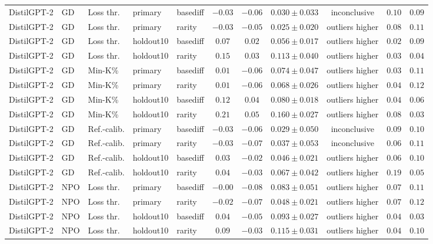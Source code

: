 \begin{table}[t]
\begin{tabular*}{\textwidth}{@{\extracolsep{\fill}}lllllcccccc@{}}
DistilGPT-2 & GD & Loss thr. & primary & basediff & $-0.03$ & $-0.06$ & $0.030 \pm 0.033$ & inconclusive & $0.10$ & $0.09$ \\
DistilGPT-2 & GD & Loss thr. & primary & rarity & $-0.03$ & $-0.05$ & $0.025 \pm 0.020$ & outliers higher & $0.08$ & $0.11$ \\
DistilGPT-2 & GD & Loss thr. & holdout10 & basediff & $0.07$ & $0.02$ & $0.056 \pm 0.017$ & outliers higher & $0.02$ & $0.09$ \\
DistilGPT-2 & GD & Loss thr. & holdout10 & rarity & $0.15$ & $0.03$ & $0.113 \pm 0.040$ & outliers higher & $0.03$ & $0.04$ \\
DistilGPT-2 & GD & Min-K\% & primary & basediff & $0.01$ & $-0.06$ & $0.074 \pm 0.047$ & outliers higher & $0.03$ & $0.11$ \\
DistilGPT-2 & GD & Min-K\% & primary & rarity & $0.01$ & $-0.06$ & $0.068 \pm 0.026$ & outliers higher & $0.04$ & $0.12$ \\
DistilGPT-2 & GD & Min-K\% & holdout10 & basediff & $0.12$ & $0.04$ & $0.080 \pm 0.018$ & outliers higher & $0.04$ & $0.06$ \\
DistilGPT-2 & GD & Min-K\% & holdout10 & rarity & $0.21$ & $0.05$ & $0.160 \pm 0.027$ & outliers higher & $0.08$ & $0.03$ \\
DistilGPT-2 & GD & Ref.-calib. & primary & basediff & $-0.03$ & $-0.06$ & $0.029 \pm 0.050$ & inconclusive & $0.09$ & $0.10$ \\
DistilGPT-2 & GD & Ref.-calib. & primary & rarity & $-0.03$ & $-0.07$ & $0.037 \pm 0.053$ & inconclusive & $0.06$ & $0.11$ \\
DistilGPT-2 & GD & Ref.-calib. & holdout10 & basediff & $0.03$ & $-0.02$ & $0.046 \pm 0.021$ & outliers higher & $0.06$ & $0.10$ \\
DistilGPT-2 & GD & Ref.-calib. & holdout10 & rarity & $0.04$ & $-0.03$ & $0.067 \pm 0.042$ & outliers higher & $0.19$ & $0.05$ \\
DistilGPT-2 & NPO & Loss thr. & primary & basediff & $-0.00$ & $-0.08$ & $0.083 \pm 0.051$ & outliers higher & $0.07$ & $0.11$ \\
DistilGPT-2 & NPO & Loss thr. & primary & rarity & $-0.02$ & $-0.07$ & $0.048 \pm 0.021$ & outliers higher & $0.07$ & $0.12$ \\
DistilGPT-2 & NPO & Loss thr. & holdout10 & basediff & $0.04$ & $-0.05$ & $0.093 \pm 0.027$ & outliers higher & $0.04$ & $0.03$ \\
DistilGPT-2 & NPO & Loss thr. & holdout10 & rarity & $0.09$ & $-0.03$ & $0.115 \pm 0.031$ & outliers higher & $0.04$ & $0.10$ \\

\end{tabular*}
\end{table}
